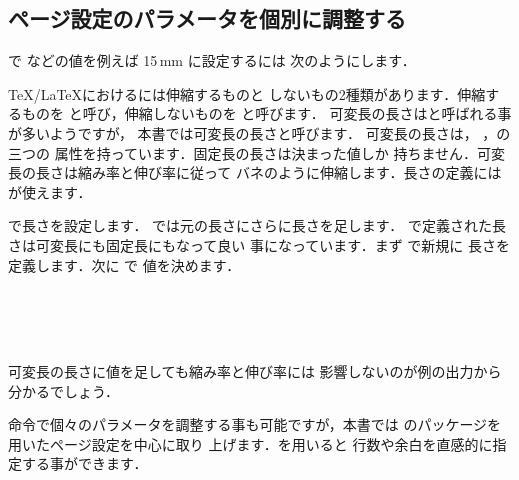 \subsection{ページ設定のパラメータを個別に調整する}
\begin{usage}
\setlength{パラメータ}{設定値}
\end{usage}
で などの値を例えば 15\,mm に設定するには
次のようにします．
\begin{inonly}
\setlength{\voffset}{15mm}
\end{inonly}


\TeX/\LaTeX におけるには伸縮するものと
しないもの2種類があります．伸縮するものを
{}と呼び，伸縮しないものを
{}と呼びます．
可変長の長さは{}と呼ばれる事が多いようですが，
本書では可変長の長さと呼びます．
可変長の長さは{}，
{}，{}の三つの
属性を持っています．固定長の長さは決まった値しか
持ちません．可変長の長さは縮み率と伸び率に従って
バネのように伸縮します．長さの定義には が使えます．
\begin{usage}
\setlength{$\<命令>$}{$\<長さ>$}
\addtolength{$\<命令>$}{$\<長さ>$}
\end{usage}
で長さを設定します．
では元の長さにさらに長さを足します．
で定義された長さは可変長にも固定長にもなって良い
事になっています．まず で新規に
長さを定義します．次に で
値を決めます．
\begin{inout}
\newlength{\newa}\the\newa\\
\setlength{\newa}{10mm}\the\newa\\
\setlength{\newa}{10mm plus 3mm
   minus 2mm}\the\newa\\
\addtolength{\newa}{3mm}\the\newa
\end{inout}
可変長の長さに値を足しても縮み率と伸び率には
影響しないのが例の出力から分かるでしょう．


命令で個々のパラメータを調整する事も可能ですが，本書では
のパッケージを用いたページ設定を中心に取り
上げます．を用いると%
行数や余白を直感的に指定する事ができます．

